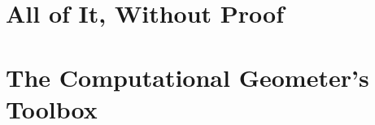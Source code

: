 \frontmatter




\mainmatter



\part{All of It, Without Proof}


\part{The Computational Geometer's Toolbox}\label{sec:preliminaries}


\appendix


%
%

\backmatter
{}
{}


\renewcommand{\listtheoremname}{List of Contributions and Open Questions}
\listoftheorems[ignoreall,show={contribution,openquestion}]
